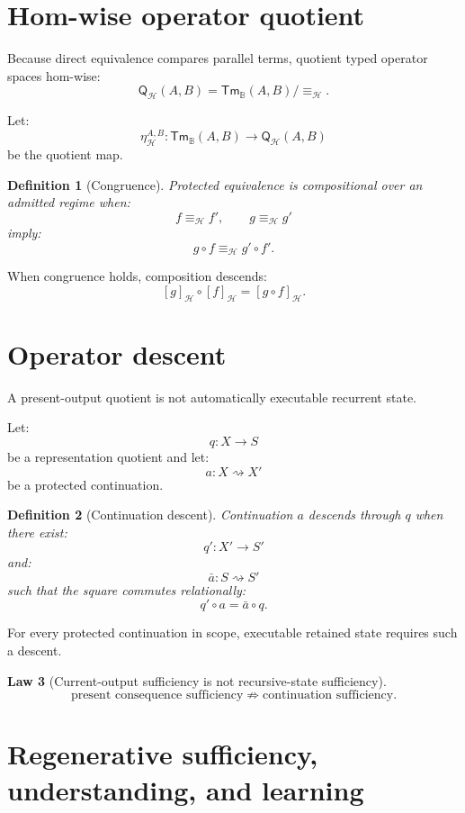 \documentclass[11pt,oneside]{article}
\newtheorem{definition}{Definition}[section]
\newtheorem{law}[definition]{Law}
\newcommand{\B}{\mathbb B}
\begin{document}
\section{Hom-wise operator quotient}

Because direct equivalence compares parallel terms, quotient typed operator spaces hom-wise:
\[
\boxed{
\mathsf Q_{\mathcal H}(A,B)
=
\mathsf{Tm}_{\B}(A,B)/
{\equiv_{\mathcal H}}.
}
\]

Let:
\[
\eta_{\mathcal H}^{A,B}:
\mathsf{Tm}_{\B}(A,B)
\to
\mathsf Q_{\mathcal H}(A,B)
\]
be the quotient map.

\begin{definition}[Congruence]
Protected equivalence is compositional over an admitted regime when:
\[
f\equiv_{\mathcal H}f',
\qquad
g\equiv_{\mathcal H}g'
\]
imply:
\[
\boxed{
g\circ f
\equiv_{\mathcal H}
g'\circ f'.
}
\]
\end{definition}

When congruence holds, composition descends:
\[
\boxed{
[g]_{\mathcal H}\circ[f]_{\mathcal H}
=
[g\circ f]_{\mathcal H}.
}
\]

\section{Operator descent}

A present-output quotient is not automatically executable recurrent state.

Let:
\[
q:X\to S
\]
be a representation quotient and let:
\[
a:X\rightsquigarrow X'
\]
be a protected continuation.

\begin{definition}[Continuation descent]
Continuation \(a\) descends through \(q\) when there exist:
\[
q':X'\to S'
\]
and:
\[
\bar a:S\rightsquigarrow S'
\]
such that the square commutes relationally:
\[
\boxed{
q'\circ a
=
\bar a\circ q.
}
\]
\end{definition}

For every protected continuation in scope, executable retained state requires such a descent.

\begin{law}[Current-output sufficiency is not recursive-state sufficiency]
\[
\boxed{
\text{present consequence sufficiency}
\not\Rightarrow
\text{continuation sufficiency}.
}
\]
\end{law}


\section{Regenerative sufficiency, understanding, and learning}
\end{document}
